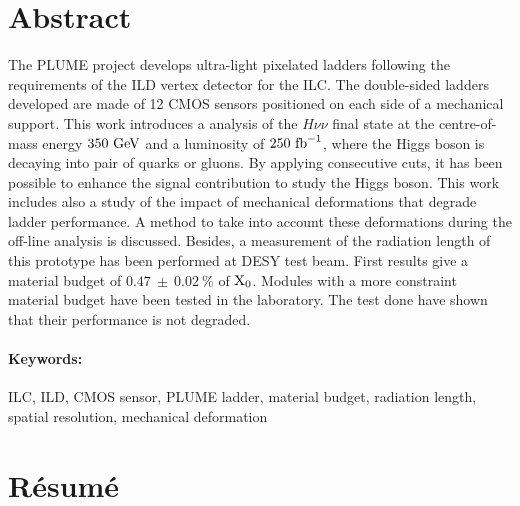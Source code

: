 \section*{Abstract}

The PLUME project develops ultra-light pixelated ladders following the requirements of the ILD vertex detector for the ILC. 
The double-sided ladders developed are made of 12 CMOS sensors positioned on each side of a mechanical support.
This work introduces a analysis of the $H\nu\nu$ final state at the centre-of-mass energy $350~\rm{GeV}$ and a luminosity of $250~\rm{fb}^{-1}$, where the Higgs boson is decaying into pair of quarks or gluons.
By applying consecutive cuts, it has been possible to enhance the signal contribution to study the Higgs boson.
This work includes also a study of the impact of mechanical deformations that degrade ladder performance.
A method to take into account these deformations during the off-line analysis is discussed.
Besides, a measurement of the radiation length of this prototype has been performed at DESY test beam.
First results give a material budget of $0.47~\pm~0.02~\%$ of $\rm{X_0}$.
Modules with a more constraint material budget have been tested in the laboratory.
The test done have shown that their performance is not degraded.




 
\paragraph{Keywords:} ILC, ILD, CMOS sensor, PLUME ladder, material budget, radiation length, spatial resolution, mechanical deformation

\newpage

\section*{Résumé}

